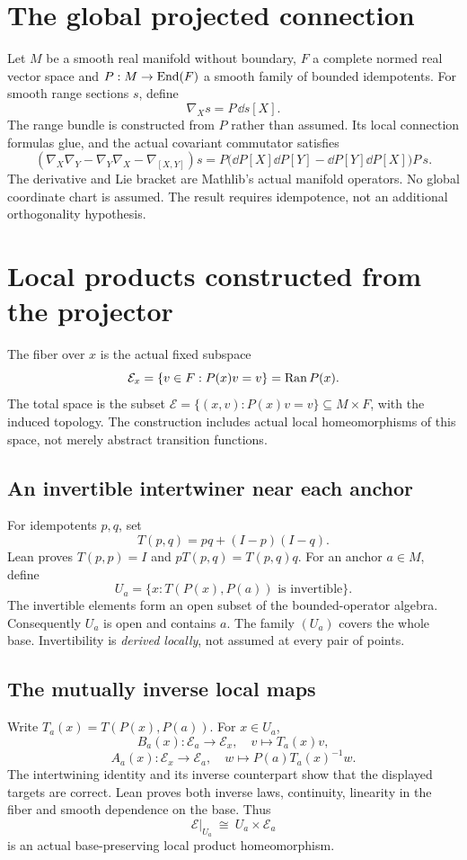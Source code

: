 \section{The global projected connection}\label{supp6:section:001}
Let $M$ be a smooth real manifold without boundary, $F$ a complete normed real vector space and $P:M\to\operatorname{End}(F)$ a smooth family of bounded idempotents. For smooth range sections $s$, define
\[
\nabla_Xs=P\,\dd s[X].
\]
The range bundle is constructed from $P$ rather than assumed. Its local connection formulas glue, and the actual covariant commutator satisfies
\[
\boxed{(\nabla_X\nabla_Y-\nabla_Y\nabla_X-\nabla_{[X,Y]})s
=P\bigl(\dd P[X]\dd P[Y]-\dd P[Y]\dd P[X]\bigr)P\,s.}
\]
The derivative and Lie bracket are Mathlib's actual manifold operators. No global coordinate chart is assumed. The result requires idempotence, not an additional orthogonality hypothesis.


\section{Local products constructed from the projector}\label{supp6:section:002}
The fiber over $x$ is the actual fixed subspace
\[
\mathcal E_x=\{v\in F:P(x)v=v\}=\Ran P(x).
\]
The total space is the subset $\mathcal E=\{(x,v):P(x)v=v\}\subseteq M\times F$, with the induced topology. The construction includes actual local homeomorphisms of this space, not merely abstract transition functions.

\subsection{An invertible intertwiner near each anchor}
For idempotents $p,q$, set
\[
T(p,q)=pq+(I-p)(I-q).
\]
Lean proves $T(p,p)=I$ and $pT(p,q)=T(p,q)q$. For an anchor $a\in M$, define
\[
U_a=\{x:T(P(x),P(a))\text{ is invertible}\}.
\]
The invertible elements form an open subset of the bounded-operator algebra. Consequently $U_a$ is open and contains $a$. The family $(U_a)$ covers the whole base. Invertibility is \emph{derived locally}, not assumed at every pair of points.

\subsection{The mutually inverse local maps}
Write $T_a(x)=T(P(x),P(a))$. For $x\in U_a$,
\[
B_a(x):\mathcal E_a\longrightarrow\mathcal E_x,
\quad v\longmapsto T_a(x)v,
\]
\[
A_a(x):\mathcal E_x\longrightarrow\mathcal E_a,
\quad w\longmapsto P(a)T_a(x)^{-1}w.
\]
The intertwining identity and its inverse counterpart show that the displayed targets are correct. Lean proves both inverse laws, continuity, linearity in the fiber and smooth dependence on the base. Thus
\[
\mathcal E|_{U_a}\ \cong\ U_a\times\mathcal E_a
\]
is an actual base-preserving local product homeomorphism.

